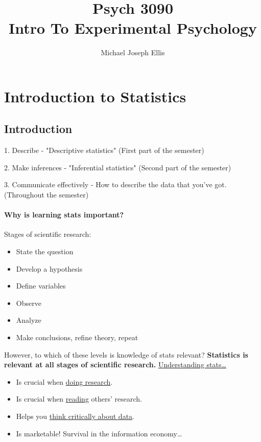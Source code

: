 \documentclass[11pt]{report}
\title{\Huge{Psych 3090}\\Intro To Experimental Psychology}
\author{\huge{Michael Joseph Ellis}}
\date{}
\begin{document}
\maketitle
\newpage
\tableofcontents
\pagebreak

\chapter{Introduction to Statistics}

\section{Introduction}

{
    1. Describe - "Descriptive statistics" (First part of the semester)
    
    2. Make inferences - "Inferential statistics" (Second part of the semester)
    
    3. Communicate effectively - How to describe the data that you've got. (Throughout the semester)
}

\subsubsection{Why is learning stats important?}
\noindent Stages of scientific research: 
\begin{itemize}
    \item State the question
    \item Develop a hypothesis 
    \item Define variables
    \item Observe
    \item Analyze
    \item Make conclusions, refine theory, repeat
\end{itemize}
However, to which of these levels is knowledge of stats relevant?
\textbf{Statistics is relevant at all stages of scientific research.}
\newline\newline
\noindent\underline{Understanding stats\dots}
\begin{itemize}
    \item Is crucial when \underline{doing research}. 
    \item Is crucial when \underline{reading} others' research.
    \item Helps you \underline{think critically about data}.
    \item Is marketable! Survival in the information economy\dots
\end{itemize}
\end{document}
